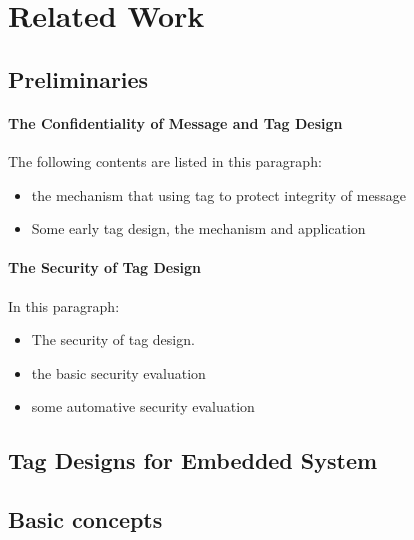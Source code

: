 \documentclass{article}
\begin{document}
\section{Related Work}
\subsection{Preliminaries}
\paragraph{The Confidentiality of Message and Tag Design}
The following contents are listed in this paragraph:
\begin{itemize}
	\item the mechanism that using tag to protect integrity of message
	\item Some early tag design, the mechanism and application
\end{itemize}
\paragraph{The Security of Tag Design}
In this paragraph:
\begin{itemize}
	\item The security of tag design.
	\item the basic security evaluation
	\item some automative security evaluation
\end{itemize}
\subsection{Tag Designs for Embedded System}
\subsection{}
\subsection{Basic concepts}
\end{document}
